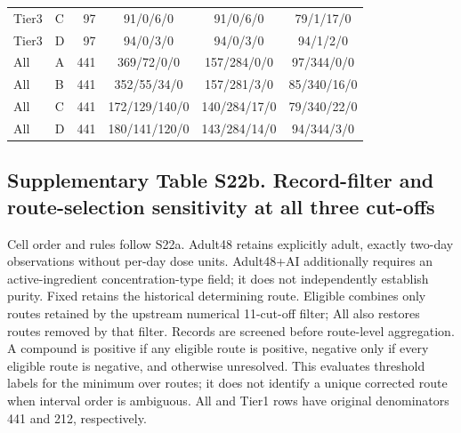 \begin{longtable}{llrccc}
Tier3 & C & 97 & 91/0/6/0 & 91/0/6/0 & 79/1/17/0 \\

Tier3 & D & 97 & 94/0/3/0 & 94/0/3/0 & 94/1/2/0 \\

All & A & 441 & 369/72/0/0 & 157/284/0/0 & 97/344/0/0 \\

All & B & 441 & 352/55/34/0 & 157/281/3/0 & 85/340/16/0 \\

All & C & 441 & 172/129/140/0 & 140/284/17/0 & 79/340/22/0 \\

All & D & 441 & 180/141/120/0 & 143/284/14/0 & 94/344/3/0 \\

\end{longtable}\endgroup

\subsection*{Supplementary Table S22b. Record-filter and route-selection sensitivity at all three cut-offs}

Cell order and rules follow S22a. Adult48 retains explicitly adult, exactly two-day observations without per-day dose units. Adult48+AI additionally requires an active-ingredient concentration-type field; it does not independently establish purity. Fixed retains the historical determining route. Eligible combines only routes retained by the upstream numerical 11-cut-off filter; All also restores routes removed by that filter. Records are screened before route-level aggregation. A compound is positive if any eligible route is positive, negative only if every eligible route is negative, and otherwise unresolved. This evaluates threshold labels for the minimum over routes; it does not identify a unique corrected route when interval order is ambiguous. All and Tier1 rows have original denominators 441 and 212, respectively.

\begingroup\footnotesize\setlength{\tabcolsep}{4pt}

